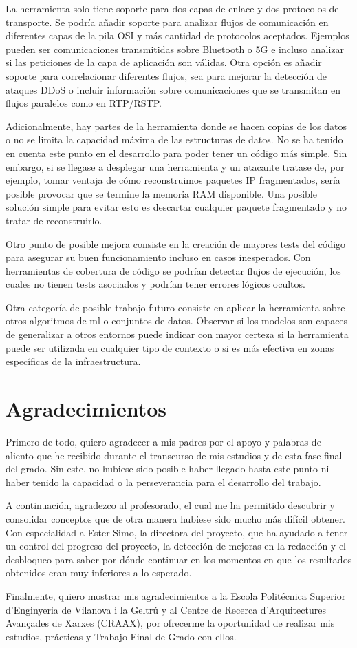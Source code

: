 La herramienta solo tiene soporte para dos capas de enlace y dos protocolos de transporte. Se podría añadir soporte para analizar flujos de comunicación en diferentes capas de la pila OSI y más cantidad de protocolos aceptados. Ejemplos pueden ser comunicaciones transmitidas sobre Bluetooth o 5G e incluso analizar si las peticiones de la capa de aplicación son válidas. Otra opción es añadir soporte para correlacionar diferentes flujos, sea para mejorar la detección de ataques DDoS o incluir información sobre comunicaciones que se transmitan en flujos paralelos como en RTP/RSTP.

Adicionalmente, hay partes de la herramienta donde se hacen copias de los datos o no se limita la capacidad máxima de las estructuras de datos. No se ha tenido en cuenta este punto en el desarrollo para poder tener un código más simple. Sin embargo, si se llegase a desplegar una herramienta y un atacante tratase de, por ejemplo, tomar ventaja de cómo reconstruimos paquetes IP fragmentados, sería posible provocar que se termine la memoria RAM disponible. Una posible solución simple para evitar esto es descartar cualquier paquete fragmentado y no tratar de reconstruirlo. 

Otro punto de posible mejora consiste en la creación de mayores tests del código para asegurar su buen funcionamiento incluso en casos inesperados. Con herramientas de cobertura de código se podrían detectar flujos de ejecución, los cuales no tienen tests asociados y podrían tener errores lógicos ocultos.

Otra categoría de posible trabajo futuro consiste en aplicar la herramienta sobre otros algoritmos de \gls{ml} o conjuntos de datos. Observar si los modelos son capaces de generalizar a otros entornos puede indicar con mayor certeza si la herramienta puede ser utilizada en cualquier tipo de contexto o si es más efectiva en zonas específicas de la infraestructura.

\section{Agradecimientos}

Primero de todo, quiero agradecer a mis padres por el apoyo y palabras de aliento que he recibido durante el transcurso de mis estudios y de esta fase final del grado. Sin este, no hubiese sido posible haber llegado hasta este punto ni haber tenido la capacidad o la perseverancia para el desarrollo del trabajo.

A continuación, agradezco al profesorado, el cual me ha permitido descubrir y consolidar conceptos que de otra manera hubiese sido mucho más difícil obtener. Con especialidad a Ester Simo, la directora del proyecto, que ha ayudado a tener un control del progreso del proyecto, la detección de mejoras en la redacción y el desbloqueo para saber por dónde continuar en los momentos en que los resultados obtenidos eran muy inferiores a lo esperado.

Finalmente, quiero mostrar mis agradecimientos a la Escola Politécnica Superior d'Enginyeria de Vilanova i la Geltrú y al Centre de Recerca d'Arquitectures Avançades de Xarxes (CRAAX), por ofrecerme la oportunidad de realizar mis estudios, prácticas y Trabajo Final de Grado con ellos. 
